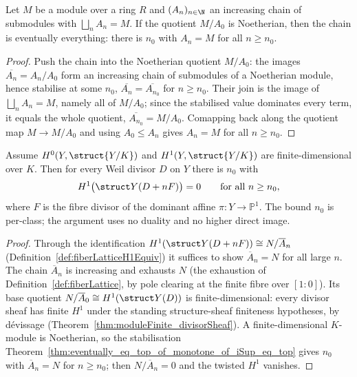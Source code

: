\begin{theorem}
  \label{thm:eventually_eq_top_of_monotone_of_iSup_eq_top}
  \leanok
  Let \(M\) be a module over a ring \(R\) and \((A_n)_{n \in \N}\) an increasing chain of submodules
  with \(\bigsqcup_n A_n = M\). If the quotient \(M / A_0\) is Noetherian, then the chain is
  eventually everything: there is \(n_0\) with \(A_n = M\) for all \(n \ge n_0\).
\end{theorem}
\begin{proof}
  \leanok
  Push the chain into the Noetherian quotient \(M / A_0\): the images \(\overline{A_n} = A_n / A_0\)
  form an increasing chain of submodules of a Noetherian module, hence stabilise at some \(n_0\),
  \(\overline{A_n} = \overline{A_{n_0}}\) for \(n \ge n_0\). Their join is the image of \(\bigsqcup_n
  A_n = M\), namely all of \(M / A_0\); since the stabilised value dominates every term, it equals
  the whole quotient, \(\overline{A_{n_0}} = M / A_0\). Comapping back along the quotient map
  \(M \to M / A_0\) and using \(A_0 \le A_n\) gives \(A_n = M\) for all \(n \ge n_0\).
\end{proof}

\begin{theorem}
  \label{thm:subsingleton_hModule_divisorSheaf_one_of_isDominant_toP1}
  \leanok
  Assume \(H^0(Y, \struct{Y/K})\) and \(H^1(Y, \struct{Y/K})\) are finite-dimensional over \(K\).
  Then for every Weil divisor \(D\) on \(Y\) there is \(n_0\) with
  \[
    H^1\bigl(\struct Y(D + nF)\bigr) = 0 \qquad \text{for all } n \ge n_0 ,
  \]
  where \(F\) is the fibre divisor of the dominant affine \(\pi \colon Y \to \mathbb P^1\). The
  bound \(n_0\) is per-class; the argument uses no duality and no higher direct image.
\end{theorem}
\begin{proof}
  \leanok
  Through the identification \(H^1(\struct Y(D + nF)) \cong N / \overline A_n\)
  (Definition~\ref{def:fiberLatticeH1Equiv}) it suffices to show \(\overline A_n = N\) for all large
  \(n\). The chain \(\overline A_n\) is increasing and exhausts \(N\) (the exhaustion of
  Definition~\ref{def:fiberLattice}, by pole clearing at the finite fibre over \([1 : 0]\)). Its
  base quotient \(N / \overline A_0 \cong H^1(\struct Y(D))\) is finite-dimensional: every divisor
  sheaf has finite \(H^1\) under the standing structure-sheaf finiteness hypotheses, by dévissage
  (Theorem~\ref{thm:moduleFinite_divisorSheaf}). A finite-dimensional \(K\)-module is Noetherian, so
  the stabilisation Theorem~\ref{thm:eventually_eq_top_of_monotone_of_iSup_eq_top} gives \(n_0\) with
  \(\overline A_n = N\) for \(n \ge n_0\); then \(N / \overline A_n = 0\) and the twisted \(H^1\)
  vanishes.
\end{proof}

